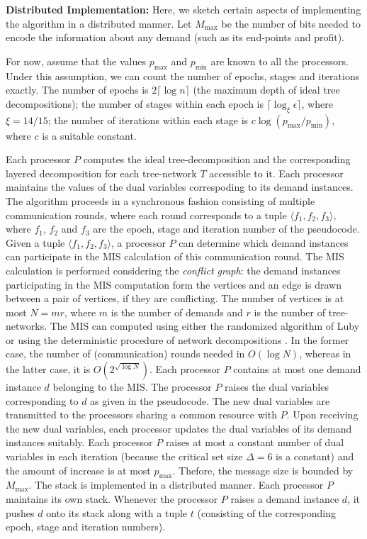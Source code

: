 \documentclass[11pt]{article}
\newcommand{\ceil}[1] {\lceil #1 \rceil}
\begin{document}
\noindent
{\bf Distributed Implementation: }
Here, we sketch certain aspects of implementing the algorithm in a distributed manner.
Let $M_{\max}$ be the number of bits needed to encode the information about any demand 
(such as its end-points and profit).

For now, assume that the values $p_{\max}$ and $p_{\min}$ are known to all the processors.
Under this assumption, we can count the number of epochs, stages and iterations exactly.
The number of epochs is $2\ceil{\log n}$ (the maximum depth of ideal tree decompositions); 
the number of stages within each epoch is $\ceil{\log_{\xi} \epsilon}$, where $\xi=14/15$;
the number of iterations within each stage is $c\log (p_{\max}/p_{\min})$, where $c$ is a suitable constant.

Each processor $P$ computes the ideal tree-decomposition and the corresponding layered decomposition
for each tree-network $T$ accessible to it.
Each processor maintains the values of the dual variables correspoding to its demand instances.
The algorithm proceeds in a synchronous fashion consisting of multiple communication rounds,
where each round corresponds to a tuple $\langle f_1, f_2, f_3\rangle$,
where $f_1$, $f_2$ and $f_3$ are the epoch, stage and iteration number of the pseudocode.
Given a tuple $\langle f_1, f_2, f_3\rangle$,
a processor $P$ can determine which demand instances can participate in the MIS calculation of this 
communication round. The MIS calculation is performed considering the {\em conflict graph}:
the demand instances participating in the MIS computation form the vertices
and an edge is drawn between a pair of vertices, if they are conflicting.
The number of vertices is at most $N=mr$, where $m$ is the number of demands
and $r$ is the number of tree-networks.
The MIS can computed using either the randomized algorithm of Luby \cite{Luby}
or using the deterministic procedure of network decompositions \cite{PancSrini}.
In the former case, the number of (communication) rounds needed in $O(\log N)$, whereas
in the latter case, it is $O(2^{\sqrt{\log N}})$.
Each processor $P$ contains at most one demand instance $d$ belonging to the MIS.
The processor $P$ raises the dual variables corresponding to $d$ as given in the pseudocode.
The new dual variables are transmitted to the processors sharing a common resource with $P$.
Upon receiving the new dual variables, each processor updates the dual variables of its demand instances suitably.
Each processor $P$ raises at most a constant number of dual variables in each iteration (because the critical set 
size $\Delta=6$ is a constant) and the amount of increase is at most $p_{\max}$.
Thefore, the message size is bounded by $M_{\max}$.
The stack is implemented in a distributed manner. Each processor $P$ maintains its own stack.
Whenever the processor $P$ raises a demand instance $d$, it pushes $d$ onto its stack
along with a tuple $t$ (consisting of the corresponding epoch, stage and iteration numbers).
\end{document}
